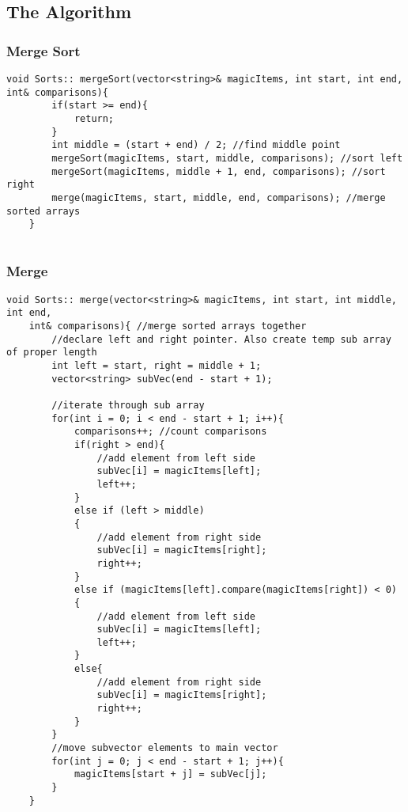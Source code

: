 \documentclass[letterpaper, 10pt,DIV=13]{scrartcl}
\numberwithin{equation}{section} %
\numberwithin{figure}{section} %
\numberwithin{table}{section} %
\begin{document}
\subsection{The Algorithm}

\subsubsection*{Merge Sort}
    \lstset{numbers=left, numberstyle=\tiny, stepnumber=1, numbersep=5pt, basicstyle=\footnotesize\ttfamily}
    \begin{lstlisting}[frame=single, ]
    void Sorts:: mergeSort(vector<string>& magicItems, int start, int end, int& comparisons){
        if(start >= end){
            return;
        }
        int middle = (start + end) / 2; //find middle point
        mergeSort(magicItems, start, middle, comparisons); //sort left
        mergeSort(magicItems, middle + 1, end, comparisons); //sort right
        merge(magicItems, start, middle, end, comparisons); //merge sorted arrays
    }
    
\end{lstlisting}

\subsubsection*{Merge}
    \lstset{numbers=left, numberstyle=\tiny, stepnumber=1, numbersep=5pt, basicstyle=\footnotesize\ttfamily}
    \begin{lstlisting}[frame=single, ]
    void Sorts:: merge(vector<string>& magicItems, int start, int middle, int end,
    int& comparisons){ //merge sorted arrays together
        //declare left and right pointer. Also create temp sub array of proper length
        int left = start, right = middle + 1;
        vector<string> subVec(end - start + 1);
    
        //iterate through sub array
        for(int i = 0; i < end - start + 1; i++){
            comparisons++; //count comparisons
            if(right > end){
                //add element from left side
                subVec[i] = magicItems[left];
                left++;
            }
            else if (left > middle)
            {
                //add element from right side
                subVec[i] = magicItems[right];
                right++;
            }
            else if (magicItems[left].compare(magicItems[right]) < 0)
            {
                //add element from left side
                subVec[i] = magicItems[left];
                left++;
            }
            else{
                //add element from right side
                subVec[i] = magicItems[right];
                right++;
            }
        }
        //move subvector elements to main vector
        for(int j = 0; j < end - start + 1; j++){
            magicItems[start + j] = subVec[j];
        }
    }
    
    
\end{lstlisting}
\end{document}
